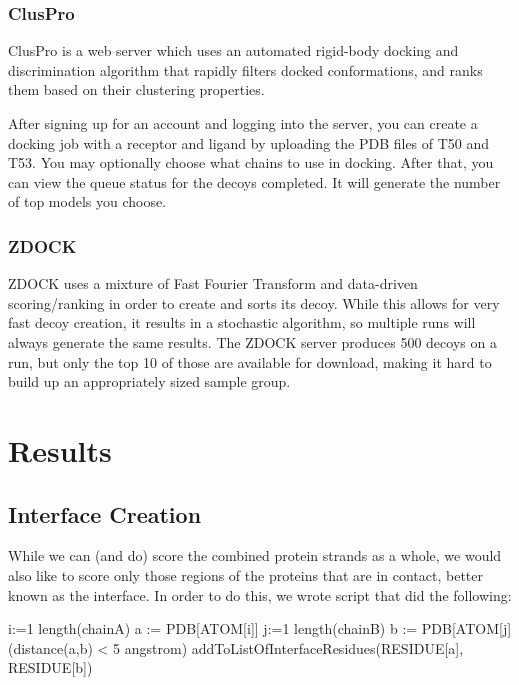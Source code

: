 \documentclass{article}
\begin{document}
\subsubsection{ClusPro}

ClusPro is a web server which uses an automated rigid-body docking and discrimination algorithm that rapidly filters docked conformations, and ranks them based on their clustering properties. 

After signing up for an account and logging into the server, you can create a docking job with a receptor and ligand by uploading the PDB files of T50 and T53. You may optionally choose what chains to use in docking. After that, you can view the queue status for the decoys completed. It will generate the number of top models you choose.

\subsubsection{ZDOCK}

ZDOCK uses a mixture of Fast Fourier Transform and data-driven scoring/ranking in order to create and sorts its decoy. While this allows for very fast decoy creation, it results in a stochastic algorithm, so multiple runs will always generate the same results. The ZDOCK server produces 500 decoys on a run, but only the top 10 of those are available for download, making it hard to build up an appropriately sized sample group.


\section{Results}



\subsection{Interface Creation}

While we can (and do) score the combined protein strands as a whole, we would also like to score only those regions of the proteins that are in contact, better known as the interface.  In order to do this, we wrote script that did the following:\\

\begin{program}
  \FOR i:=1 \TO length(chainA)  \DO
	a := PDB[ATOM[i]]
    \FOR j:=1 \TO length(chainB)  \DO
	b := PDB[ATOM[j]
    \IF (distance(a,b) < 5 angstrom) \DO
addToListOfInterfaceResidues(RESIDUE[a], RESIDUE[b])
    \END
   \END
\END
\end{program}
\end{document}
